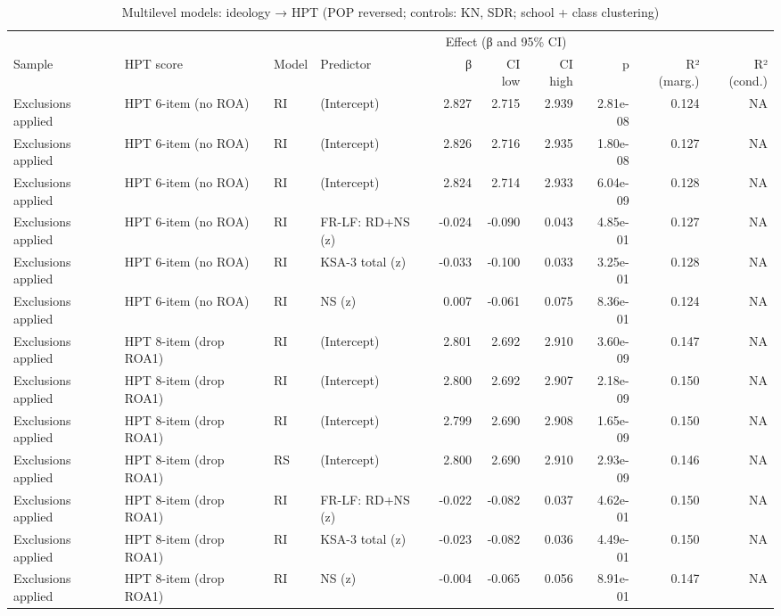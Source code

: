 \documentclass[
  10pt,
]{article}
\begin{document}
\begin{table}[t]
\caption*{
{\fontsize{20}{25}\selectfont  Multilevel models: ideology → HPT (POP reversed; controls: KN, SDR; school + class clustering)\fontsize{12}{15}\selectfont }
}
\fontsize{12.0pt}{14.0pt}\selectfont
\begin{tabular*}{\linewidth}{@{\extracolsep{\fill}}llllrrrrrr}
\toprule
 &  &  &  & \multicolumn{3}{c}{{Effect (β and 95\% CI)}} &  &  &  \\
\cmidrule(lr){5-7}
Sample & HPT score & Model & Predictor & β & CI low & CI high & p & R² (marg.) & R² (cond.) \\
\midrule\addlinespace[2.5pt]
Exclusions applied & HPT 6-item (no ROA) & RI & (Intercept) & 2.827 & 2.715 & 2.939 & 2.81e-08 & 0.124 & NA \\
Exclusions applied & HPT 6-item (no ROA) & RI & (Intercept) & 2.826 & 2.716 & 2.935 & 1.80e-08 & 0.127 & NA \\
Exclusions applied & HPT 6-item (no ROA) & RI & (Intercept) & 2.824 & 2.714 & 2.933 & 6.04e-09 & 0.128 & NA \\
Exclusions applied & HPT 6-item (no ROA) & RI & FR-LF: RD+NS (z) & -0.024 & -0.090 & 0.043 & 4.85e-01 & 0.127 & NA \\
Exclusions applied & HPT 6-item (no ROA) & RI & KSA-3 total (z) & -0.033 & -0.100 & 0.033 & 3.25e-01 & 0.128 & NA \\
Exclusions applied & HPT 6-item (no ROA) & RI & NS (z) & 0.007 & -0.061 & 0.075 & 8.36e-01 & 0.124 & NA \\
Exclusions applied & HPT 8-item (drop ROA1) & RI & (Intercept) & 2.801 & 2.692 & 2.910 & 3.60e-09 & 0.147 & NA \\
Exclusions applied & HPT 8-item (drop ROA1) & RI & (Intercept) & 2.800 & 2.692 & 2.907 & 2.18e-09 & 0.150 & NA \\
Exclusions applied & HPT 8-item (drop ROA1) & RI & (Intercept) & 2.799 & 2.690 & 2.908 & 1.65e-09 & 0.150 & NA \\
Exclusions applied & HPT 8-item (drop ROA1) & RS & (Intercept) & 2.800 & 2.690 & 2.910 & 2.93e-09 & 0.146 & NA \\
Exclusions applied & HPT 8-item (drop ROA1) & RI & FR-LF: RD+NS (z) & -0.022 & -0.082 & 0.037 & 4.62e-01 & 0.150 & NA \\
Exclusions applied & HPT 8-item (drop ROA1) & RI & KSA-3 total (z) & -0.023 & -0.082 & 0.036 & 4.49e-01 & 0.150 & NA \\
Exclusions applied & HPT 8-item (drop ROA1) & RI & NS (z) & -0.004 & -0.065 & 0.056 & 8.91e-01 & 0.147 & NA \\

\end{tabular*}
\end{table}
\end{document}

